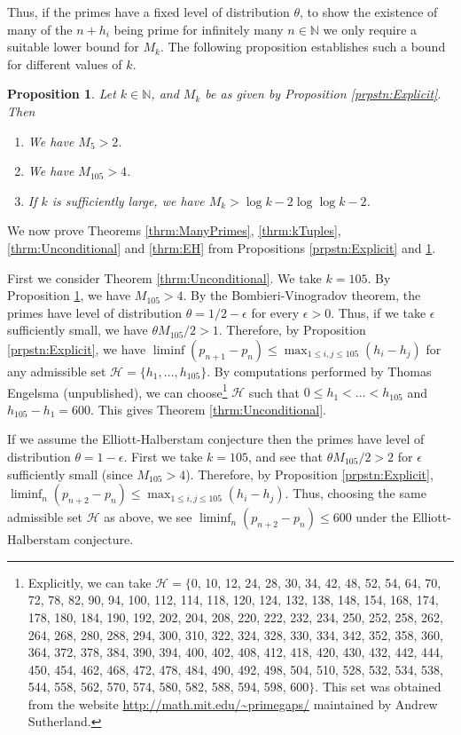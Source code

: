 \documentclass[12pt,a4paper]{amsart}
\theoremstyle{plain}
\newtheorem{prpstn}[thrm]{Proposition}
\numberwithin{sblmm}{thrm}
\numberwithin{equation}{section}
\begin{document}
Thus, if the primes have a fixed level of distribution $\theta$, to show the existence of many of the $n+h_i$ being prime for infinitely many $n\in\mathbb{N}$ we only require a suitable lower bound for $M_k$. The following proposition establishes such a bound for different values of $k$.
\begin{prpstn}\label{prpstn:FChoices}Let $k\in\mathbb{N}$, and $M_k$ be as given by Proposition \ref{prpstn:Explicit}. Then
\begin{enumerate}
\item We have $M_5>2$.
\item We have $M_{105}>4$.
\item If $k$ is sufficiently large, we have $M_k>\log{k}-2\log\log{k}-2$.
\end{enumerate}
\end{prpstn}
We now prove Theorems \ref{thrm:ManyPrimes}, \ref{thrm:kTuples}, \ref{thrm:Unconditional} and \ref{thrm:EH} from Propositions \ref{prpstn:Explicit}  and \ref{prpstn:FChoices}. 

First we consider Theorem \ref{thrm:Unconditional}. We take $k=105$. By Proposition \ref{prpstn:FChoices}, we have $M_{105}>4$. By the Bombieri-Vinogradov theorem, the primes have level of distribution $\theta=1/2-\epsilon$ for every $\epsilon>0$. Thus, if we take $\epsilon$ sufficiently small, we have $\theta M_{105}/2>1$. Therefore, by Proposition \ref{prpstn:Explicit}, we have $\liminf(p_{n+1}-p_n)\le \max_{1\le i,j\le 105}(h_i-h_j)$ for any admissible set $\mathcal{H}=\{h_1,\dotsc,h_{105}\}$. By computations performed by Thomas Engelsma (unpublished), we can choose\footnote{Explicitly, we can take $\mathcal{H}=\{$0, 10, 12, 24, 28,  30, 34, 42, 48, 52, 54,  64, 70, 72, 78, 82, 90, 94,  100, 112, 114, 118, 120,  124, 132, 138, 148, 154,  168, 174, 178, 180, 184,  190, 192, 202, 204, 208,  220, 222, 232, 234, 250,  252, 258, 262, 264, 268,  280, 288, 294, 300, 310,  322, 324, 328, 330, 334,  342, 352, 358, 360, 364,  372, 378, 384, 390, 394,  400, 402, 408, 412, 418,  420, 430, 432, 442, 444,  450, 454, 462, 468, 472,  478, 484, 490, 492, 498,  504, 510, 528, 532, 534,  538, 544, 558, 562, 570,  574, 580, 582, 588, 594,  598, 600$\}.$ This set was obtained from the website \url{http://math.mit.edu/~primegaps/} maintained by Andrew Sutherland.} $\mathcal{H}$ such that $0\le h_1<\dotsc<h_{105}$ and $h_{105}-h_1=600$. This gives Theorem \ref{thrm:Unconditional}.

If we assume the Elliott-Halberstam conjecture then the primes have level of distribution $\theta=1-\epsilon$. First we take $k=105$, and see that $\theta M_{105}/2>2$ for $\epsilon$ sufficiently small (since $M_{105}>4$). Therefore, by Proposition \ref{prpstn:Explicit}, $\liminf_n(p_{n+2}-p_n)\le \max_{1\le i,j\le 105}(h_i-h_j)$. Thus, choosing the same admissible set $\mathcal{H}$ as above, we see $\liminf_n(p_{n+2}-p_n)\le 600$ under the Elliott-Halberstam conjecture. 
\end{document}
